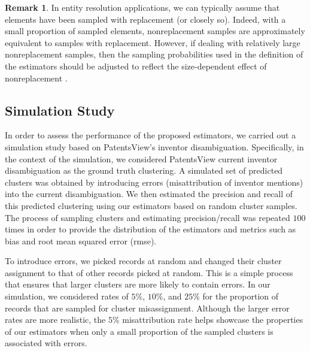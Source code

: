 \documentclass[fontsize=11pt]{article}
\theoremstyle{definition}
\newtheorem{remark}{Remark}
\begin{document}

\begin{remark}
    In entity resolution applications, we can typically assume that elements have been sampled with replacement (or closely so). Indeed, with a small proportion of sampled elements, nonreplacement samples are approximately equivalent to samples with replacement. However, if dealing with relatively large nonreplacement samples, then the sampling probabilities used in the definition of the estimators should be adjusted to reflect the size-dependent effect of nonreplacement \citep{Horvitz1952}.
\end{remark}

\subsection{Simulation Study}\label{sec:simulation_study}

In order to assess the performance of the proposed estimators, we carried out a simulation study based on PatentsView's inventor disambiguation. Specifically, in the context of the simulation, we considered PatentsView current inventor disambiguation as the ground truth clustering. A simulated set of predicted clusters was obtained by introducing errors (misattribution of inventor mentions) into the current disambiguation. We then estimated the precision and recall of this predicted clustering using our estimators based on random cluster samples. The process of sampling clusters and estimating precision/recall was repeated $100$ times in order to provide the distribution of the estimators and metrics such as bias and root mean squared error (rmse). 

To introduce errors, we picked records at random and changed their cluster assignment to that of other records picked at random. This is a simple process that ensures that larger clusters are more likely to contain errors. In our simulation, we considered rates of $5\%$, $10\%$, and $25\%$ for the proportion of records that are sampled for cluster misassignment. Although the larger error rates are more realistic, the $5\%$ misattribution rate helps showcase the properties of our estimators when only a small proportion of the sampled clusters is associated with errors.
\end{document}
